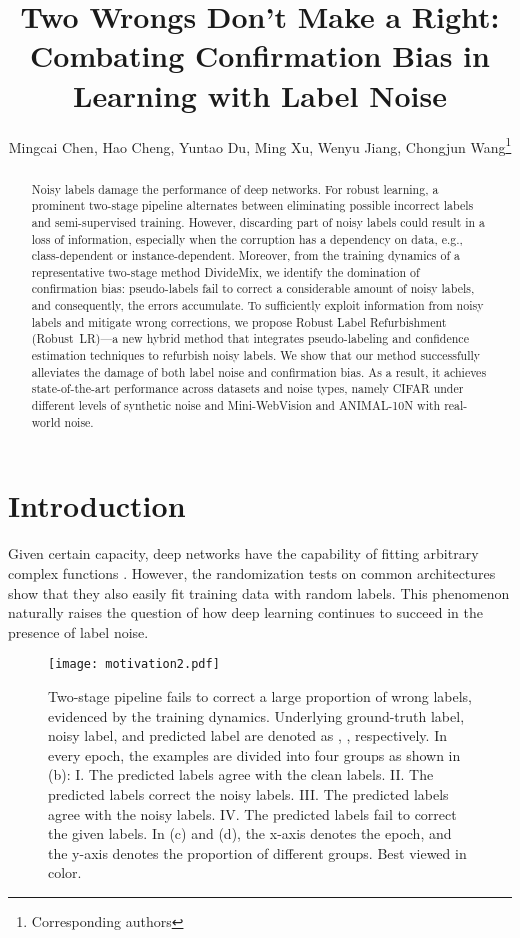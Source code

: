 \documentclass[letterpaper]{article} \usepackage{aaai23}  \usepackage{times}  \usepackage{helvet}  \usepackage{courier}  \usepackage[hyphens]{url}  \usepackage{graphicx} \urlstyle{rm} \def\UrlFont{\rm}  \usepackage{natbib}  \usepackage{caption} \frenchspacing  \setlength{\pdfpagewidth}{8.5in} \setlength{\pdfpageheight}{11in} \usepackage{algorithm}
\title{Two Wrongs Don't Make a Right: \\ Combating Confirmation Bias in Learning with Label Noise}
\author{
  Mingcai Chen, Hao Cheng, Yuntao Du, Ming Xu, Wenyu Jiang, Chongjun Wang\thanks{Corresponding authors}\\
}
\begin{document}
\maketitle
\begin{abstract}
    Noisy labels damage the performance of deep networks. 
    For robust learning, a prominent two-stage pipeline alternates between eliminating possible incorrect labels and semi-supervised training.
    However, discarding part of noisy labels could result in a loss of information, especially when the corruption has a dependency on data, e.g., class-dependent or instance-dependent.
    Moreover, from the training dynamics of a representative two-stage method DivideMix, we identify the domination of confirmation bias: pseudo-labels fail to correct a considerable amount of noisy labels, and consequently, the errors accumulate.
    To sufficiently exploit information from noisy labels and mitigate wrong corrections, we propose Robust Label Refurbishment (Robust~LR)---a new hybrid method that integrates pseudo-labeling and confidence estimation techniques to refurbish noisy labels.
    We show that our method successfully alleviates the damage of both label noise and confirmation bias.
    As a result, it achieves state-of-the-art performance across datasets and noise types, namely CIFAR under different levels of synthetic noise and Mini-WebVision and ANIMAL-10N with real-world noise. 
\end{abstract}


\section{Introduction}
Given certain capacity, deep networks have the capability of fitting arbitrary complex functions \cite{cybenko1989approximation}. 
However, the randomization tests on common architectures \cite{edgington2007randomization,zhang2016understanding,arpit2017closer} show that they also easily fit training data with random labels.
This phenomenon naturally raises the question of how deep learning continues to succeed in the presence of label noise.

\begin{figure*}[t] 
    \centering
    \texttt{[image: motivation2.pdf]} 
    \caption{
    Two-stage pipeline fails to correct a large proportion of wrong labels, evidenced by the training dynamics.
    Underlying ground-truth label, noisy label, and predicted label are denoted as , ,  respectively.
    In every epoch, the examples are divided into four groups as shown in (b):
    I. The predicted labels agree with the clean labels. II. The predicted labels correct the noisy labels. III. The predicted labels agree with the noisy labels. IV. The predicted labels fail to correct the given labels. In (c) and (d), the x-axis denotes the epoch, and the y-axis denotes the proportion of different groups.
    Best viewed in color.
    }
    \label{motivation}
\end{figure*}
\end{document}

